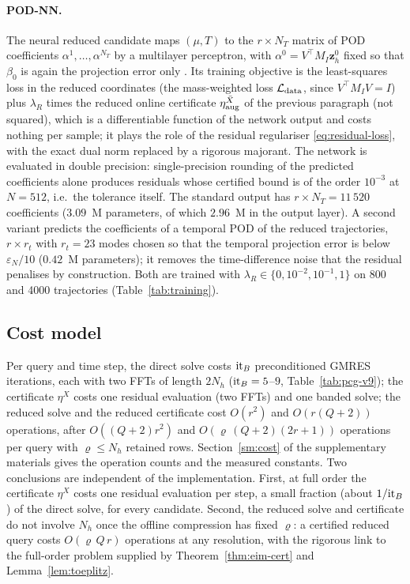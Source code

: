 \documentclass[hidelinks]{siamart251216}
\newcommand{\zz}{\mathbf z}
\begin{document}
\paragraph{POD-NN.}
The neural reduced candidate maps $(\mu,T)$ to the $r\times N_T$ matrix of POD coefficients
$\alpha^1,\dots,\alpha^{N_T}$ by a multilayer perceptron, with $\alpha^0=V^\top M_I\zz_h^0$ fixed
so that $\beta_0$ is again the projection error only
\cite{HesthavenUbbiali2018}.  Its training objective is the least-squares loss in the reduced
coordinates (the mass-weighted loss $\mathcal L_{\rm data}$, since $V^\top M_IV=I$) plus
$\lambda_R$ times the reduced online certificate $\eta^{\bar X}_{\rm aug}$ of the previous paragraph
(not squared), which is a differentiable function of the network output and costs nothing per
sample; it plays the role of the residual regulariser \eqref{eq:residual-loss}, with the exact dual
norm replaced by a rigorous majorant.  The network is evaluated in double precision: single-precision rounding of the
predicted coefficients alone produces residuals whose certified bound is of the order $10^{-3}$ at
$N=512$, i.e.\ the tolerance itself.  The standard output has $r\times N_T=11\,520$ coefficients ($3.09$~M parameters, of which $2.96$~M in
the output layer).  A second variant predicts the coefficients of a temporal POD of the reduced
trajectories, $r\times r_t$ with $r_t=23$ modes chosen so that the temporal projection error is
below $\varepsilon_N/10$ ($0.42$~M parameters); it removes the time-difference noise that the
residual penalises by construction.  Both are trained with $\lambda_R\in\{0,10^{-2},10^{-1},1\}$ on
800 and 4000 trajectories (Table~\ref{tab:training}).

\subsection{Cost model}
\label{ssec:cost}
Per query and time step, the direct solve costs ${\rm it}_B$ preconditioned GMRES iterations, each
with two FFTs of length $2N_h$ (${\rm it}_B=5$--$9$, Table~\ref{tab:pcg-v9}); the certificate $\eta^X$
costs one residual evaluation (two FFTs) and one banded solve; the reduced solve and the reduced
certificate cost $O(r^2)$ and $O(r(Q+2))$ operations, after $O((Q+2)r^2)$ and
$O(\varrho\,(Q+2)(2r+1))$ operations per query with $\varrho\le N_h$ retained rows.  Section~\ref{sm:cost}
of the supplementary materials gives the operation counts and the measured constants.  Two conclusions are
independent of the implementation.  First, at full order the certificate $\eta^X$ costs one
residual evaluation per step, a small fraction (about $1/{\rm it}_B$) of the direct solve, for
every candidate.  Second, the reduced solve and certificate do not
involve $N_h$ once the offline compression has fixed $\varrho$: a certified reduced query costs
$O(\varrho\,Q\,r)$ operations at any resolution, with the rigorous link to the full-order problem
supplied by Theorem~\ref{thm:eim-cert} and Lemma~\ref{lem:toeplitz}.
\end{document}
